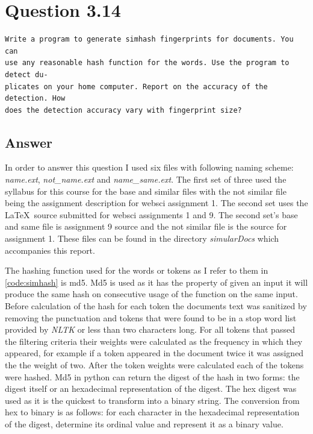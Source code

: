 \documentclass[11pt]{article}
\newenvironment{code}{\captionsetup{type=listing}}{}
\begin{document}
\begin{code}
	\label{code:crawler}
\end{code}
\newpage
\clearpage
\section{Question 3.14}
\begin{verbatim}
Write a program to generate simhash fingerprints for documents. You can
use any reasonable hash function for the words. Use the program to detect du-
plicates on your home computer. Report on the accuracy of the detection. How
does the detection accuracy vary with fingerprint size?
\end{verbatim}
\subsection{Answer}
\setcounter{listing}{2}
In order to answer this question I used six files with following naming scheme: \emph{name.ext}, \emph{not\_name.ext} and \emph{name\_same.ext}. The first set of three used the syllabus for this course for the base and similar files with the not similar file being the assignment description for websci assignment 1. The second set uses the \LaTeX \ source submitted for websci assignments 1 and 9. The second set's base and same file is assignment 9 source and the not similar file is the source for assignment 1. These files can be found in the directory \emph{simularDocs} which accompanies this report. \newline

\noindent
The hashing function used for the words or tokens as I refer to them in \autoref{code:simhash} is md5. Md5 is used as it has the property of given an input it will produce the same hash on consecutive usage of the function on the same input. Before calculation of the hash for each token the documents text was sanitized by removing the punctuation and tokens that were found to be in a stop word list provided by \textit{NLTK} \cite{nltk} or less than two characters long. For all tokens that passed the filtering criteria their weights were calculated as the frequency in which they appeared, for example if a token appeared in the document twice it was assigned the the weight of two. After the token weights were calculated each of the tokens were hashed. Md5 in python can return the digest of the hash in two forms: the digest itself or an hexadecimal representation of the digest. The hex digest was used as it is the quickest to transform into a binary string. The conversion from hex to binary is as follows: for each character in the hexadecimal representation of the digest, determine its ordinal value and represent it as a binary value.\newline
\end{document}
